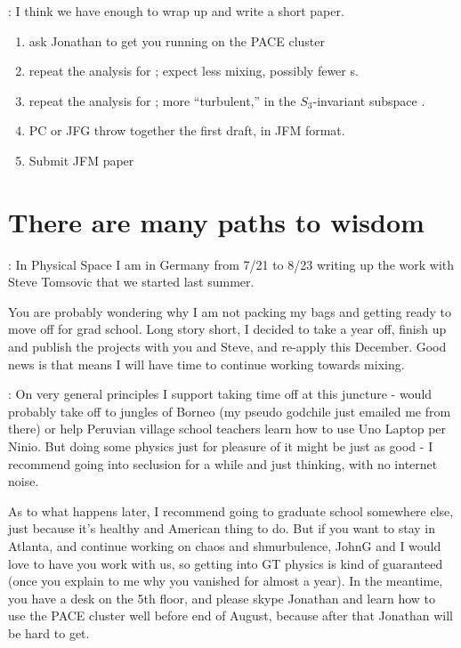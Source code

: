  :
 I think we have enough to wrap up and write a short paper.
    \begin{enumerate}
\item
    ask Jonathan to get you running on the PACE cluster
\item
    repeat the analysis for \tLB; expect less mixing, possibly fewer
    \stagp s.
\item
    repeat the analysis for \tEQeight; more ``turbulent,''
    in the $S_3$-invariant subspace .
\item
PC or JFG throw together the first draft, in JFM format.
\item
 Submit JFM paper
\end{enumerate}

\section{There are many paths to wisdom}

:
In Physical Space I am in Germany from 7/21 to 8/23 writing up the work with Steve Tomsovic that we started last summer.

You are probably wondering why I am not packing my bags and getting ready to move off for grad school. Long story short, I decided to take a year off, finish up and publish the projects with you and Steve, and re-apply this December. Good news is that means I will have time to continue working towards mixing.

\medskip{}:
On very general principles I support taking time off at this juncture - would probably
take off to jungles of Borneo (my pseudo godchile just emailed me from there) or
help Peruvian village school teachers learn how to use Uno Laptop per Ninio.
But doing some physics just for pleasure of it might be just as good - I recommend
     {going into seclusion} for a while and just thinking, with no internet noise.

As to what happens later, I recommend going to graduate school somewhere else, just
because it's healthy and American thing to do. But if you want to stay in Atlanta,
and continue working on chaos and shmurbulence, JohnG and I would love to have you work
with us, so getting into GT physics is kind of guaranteed (once you explain to me why
you vanished for almost a year). In the meantime, you have a desk on the 5th floor,
and please skype Jonathan and learn how to use the PACE cluster well before end of
August, because after that Jonathan will be hard to get.


